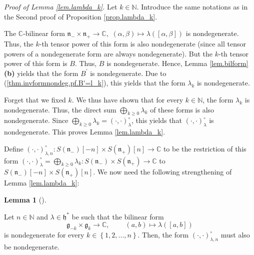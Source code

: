 \documentclass
[numbers=enddot,12pt,final,onecolumn,german,notitlepage]{scrartcl}%
\theoremstyle{definition}
\newtheorem{lem}[theo]{Lemma}
\newenvironment{lemma}[1][]
{\begin{lem}[#1]\begin{leftbar}}
{\end{leftbar}\end{lem}}
\begin{document}
\textit{Proof of Lemma \ref{lem.lambda_k}.} Let $k\in\mathbb{N}$. Introduce
the same notations as in the Second proof of Proposition \ref{prop.lambda_k}.

The $\mathbb{C}$-bilinear form $\mathfrak{n}_{-}\times\mathfrak{n}%
_{+}\rightarrow\mathbb{C},$ $\left(  \alpha,\beta\right)  \mapsto
\lambda\left(  \left[  \alpha,\beta\right]  \right)  $ is nondegenerate. Thus,
the $k$-th tensor power of this form is also nondegenerate (since all tensor
powers of a nondegenerate form are always nondegenerate). But the $k$-th
tensor power of this form is $B$. Thus, $B$ is nondegenerate. Hence, Lemma
\ref{lem.bilform} \textbf{(b)} yields that the form $B^{\prime}$ is
nondegenerate. Due to (\ref{thm.invformnondeg.pf.B'=l_k}), this yields that
the form $\lambda_{k}$ is nondegenerate.

Forget that we fixed $k$. We thus have shown that for every $k\in\mathbb{N}$,
the form $\lambda_{k}$ is nondegenerate. Thus, the direct sum $\bigoplus
\limits_{k\geq0}\lambda_{k}$ of these forms is also nondegenerate. Since
$\bigoplus\limits_{k\geq0}\lambda_{k}=\left(  \cdot,\cdot\right)  _{\lambda
}^{\circ}$, this yields that $\left(  \cdot,\cdot\right)  _{\lambda}^{\circ}$
is nondegenerate. This proves Lemma \ref{lem.lambda_k}.

Define $\left(  \cdot,\cdot\right)  _{\lambda,n}^{\circ}:S\left(
\mathfrak{n}_{-}\right)  \left[  -n\right]  \times S\left(  \mathfrak{n}%
_{+}\right)  \left[  n\right]  \rightarrow\mathbb{C}$ to be the restriction of
this form $\left(  \cdot,\cdot\right)  _{\lambda}^{\circ}=\bigoplus
\limits_{k\geq0}\lambda_{k}:S\left(  \mathfrak{n}_{-}\right)  \times S\left(
\mathfrak{n}_{+}\right)  \rightarrow\mathbb{C}$ to $S\left(  \mathfrak{n}%
_{-}\right)  \left[  -n\right]  \times S\left(  \mathfrak{n}_{+}\right)
\left[  n\right]  $. We now need the following strengthening of Lemma
\ref{lem.lambda_k}:

\begin{lemma}
\label{lem.lambda_k.2}Let $n\in\mathbb{N}$ and $\lambda\in\mathfrak{h}^{\ast}$
be such that the bilinear form%
\[
\mathfrak{g}_{-k}\times\mathfrak{g}_{k}\rightarrow\mathbb{C}%
,\ \ \ \ \ \ \ \ \ \ \left(  a,b\right)  \mapsto\lambda\left(  \left[
a,b\right]  \right)
\]
is nondegenerate for every $k\in\left\{  1,2,...,n\right\}  $. Then, the form
$\left(  \cdot,\cdot\right)  _{\lambda,n}^{\circ}$ must also be nondegenerate.
\end{lemma}
\end{document}
